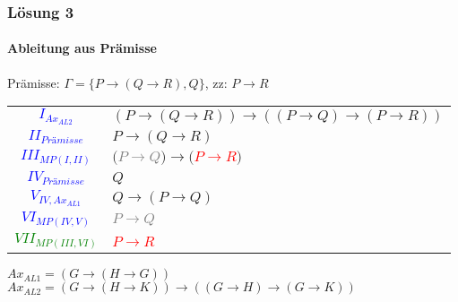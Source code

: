 \begin{frame}
	\frametitle{Lösung 3}
	\framesubtitle{Ableitung aus Prämisse}
	Prämisse: $\Gamma =\{P\rightarrow(Q\rightarrow R), Q\}$, zz: $P\rightarrow R$\\
	\begin{tabular}{cl}
		\textcolor{blue}{$I_{Ax_{AL2}}$}           & $(P\rightarrow(Q\rightarrow R))\rightarrow((P\rightarrow Q)\rightarrow(P\rightarrow R))$ \\
		\textcolor{blue}{$II_{\textit{Prämisse}}$} & $P\rightarrow(Q\rightarrow R)$                                                           \\
		\textcolor{blue}{$III_{MP(I, II)}$}        & $($\textcolor{gray}{$P\rightarrow Q$}$)\rightarrow($\textcolor{red}{$P\rightarrow R$}$)$ \\
		\textcolor{blue}{$IV_{\textit{Prämisse}}$} & $Q$                                                                                      \\
		\textcolor{blue}{$V_{IV, Ax_{AL1}}$}       & $Q\rightarrow(P\rightarrow Q)$                                                           \\
		\textcolor{blue}{$VI_{MP(IV, V)}$}         & \textcolor{gray}{$P\rightarrow Q$}                                                       \\
		\textcolor{green}{$VII_{MP(III, VI)}$}     & \textcolor{red}{$P\rightarrow R$}                                                        \\
	\end{tabular}
	$Ax_{AL1} = (G\rightarrow(H\rightarrow G))$\\
	$Ax_{AL2} = (G\rightarrow(H\rightarrow K))\rightarrow((G\rightarrow H)\rightarrow(G\rightarrow K))$\\
\end{frame}
